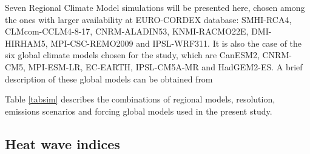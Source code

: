 Seven Regional Climate Model simulations will be presented here, chosen among the
ones with larger availability at EURO-CORDEX database: SMHI-RCA4, CLMcom-CCLM4-8-17,
CNRM-ALADIN53, KNMI-RACMO22E, DMI-HIRHAM5, MPI-CSC-REMO2009 and IPSL-WRF311.
It is also the case of the six global climate models chosen for the study, which are
CanESM2, CNRM-CM5, MPI-ESM-LR, EC-EARTH, IPSL-CM5A-MR and HadGEM2-ES. A brief
description of these global models can be obtained from \cite{tay_al2012,jac_al2014}




Table \ref{tabsim} describes the combinations of regional models, resolution,
emissions scenarios and forcing global models used in the present study.


\subsection{Heat wave indices}

